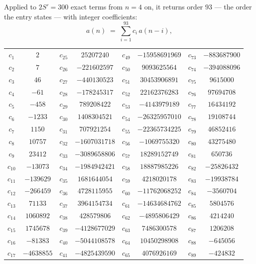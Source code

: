 \documentclass[11pt,a4paper]{article}
\theoremstyle{plain}
\theoremstyle{definition}
\begin{document}
Applied to $2S'=300$ exact terms from $n=4$ on, it returns order $93$ --- the
order the entry states --- with integer coefficients:
\[
a(n)\;=\;\sum_{i=1}^{93}c_i\,a(n-i),
\]
\begin{center}\small
\begin{tabular}{cccccccc}
$c_{1}$ & $2$ & $c_{25}$ & $25207240$ & $c_{49}$ & $-15958691969$ & $c_{73}$ & $-883687900$ \\
$c_{2}$ & $7$ & $c_{26}$ & $-221602597$ & $c_{50}$ & $9093625564$ & $c_{74}$ & $-394088096$ \\
$c_{3}$ & $46$ & $c_{27}$ & $-440130523$ & $c_{51}$ & $30453906891$ & $c_{75}$ & $9615000$ \\
$c_{4}$ & $-61$ & $c_{28}$ & $-178245317$ & $c_{52}$ & $22162376283$ & $c_{76}$ & $97694708$ \\
$c_{5}$ & $-458$ & $c_{29}$ & $789208422$ & $c_{53}$ & $-4143979189$ & $c_{77}$ & $16434192$ \\
$c_{6}$ & $-1233$ & $c_{30}$ & $1408304521$ & $c_{54}$ & $-26325957010$ & $c_{78}$ & $19108744$ \\
$c_{7}$ & $1150$ & $c_{31}$ & $707921254$ & $c_{55}$ & $-22365734225$ & $c_{79}$ & $46852416$ \\
$c_{8}$ & $10757$ & $c_{32}$ & $-1607031718$ & $c_{56}$ & $-1069755320$ & $c_{80}$ & $43275480$ \\
$c_{9}$ & $23412$ & $c_{33}$ & $-3089658806$ & $c_{57}$ & $18289152749$ & $c_{81}$ & $650736$ \\
$c_{10}$ & $-13073$ & $c_{34}$ & $-1984942421$ & $c_{58}$ & $18887985226$ & $c_{82}$ & $-25826432$ \\
$c_{11}$ & $-139629$ & $c_{35}$ & $1681644054$ & $c_{59}$ & $4218020178$ & $c_{83}$ & $-19938784$ \\
$c_{12}$ & $-266459$ & $c_{36}$ & $4728115955$ & $c_{60}$ & $-11762068252$ & $c_{84}$ & $-3560704$ \\
$c_{13}$ & $71133$ & $c_{37}$ & $3964154734$ & $c_{61}$ & $-14634684762$ & $c_{85}$ & $5804576$ \\
$c_{14}$ & $1060892$ & $c_{38}$ & $428579806$ & $c_{62}$ & $-4895806429$ & $c_{86}$ & $4214240$ \\
$c_{15}$ & $1745678$ & $c_{39}$ & $-4128677029$ & $c_{63}$ & $7486300578$ & $c_{87}$ & $1206208$ \\
$c_{16}$ & $-81383$ & $c_{40}$ & $-5044108578$ & $c_{64}$ & $10450298908$ & $c_{88}$ & $-645056$ \\
$c_{17}$ & $-4638855$ & $c_{41}$ & $-4825439590$ & $c_{65}$ & $4076926169$ & $c_{89}$ & $-424832$ \\

\end{tabular}
\end{center}
\end{document}
